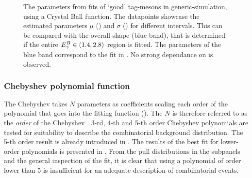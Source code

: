 \begin{figure}[htbp!]
    \caption{\label{fig:crystal_ball_par_test}The parameters from \Mbc fits of `good' tag-\B mesons in generic-\BB simulation, using a Crystal Ball function.
    The datapoints showcase the estimated parameters $\mu$ () and $\sigma$ () for different
    \EB intervals.
    This can be compared with the overall shape (blue band), that is determined if the entire ${E^B_{\gamma}}\in(1.4,2.8)$ region is fitted.
    The parameters of the blue band correspond to the fit in .
    No strong dependance on \EB is observed.
    }
\end{figure}

\subsubsection{Chebyshev polynomial function}\label{sec:chebyshev_prefit}

The Chebyshev \PDF takes $N$ parameters as coefficients scaling each order of the polynomial that goes into the fitting function ().
The $N$ is therefore referred to as the \textit{order} of the Chebyshev \PDF.
3-rd, 4-th and 5-th order Chebyshev polynomials are tested for suitability to describe the combinatorial \BB background distribution.
The 5-th order result is already introduced in .
The results of the best fit for lower-order polynomials is presented in .
From the pull distributions in the subpanels and the general inspection of the fit, it is clear that using a polynomial of order lower than 5 is insufficient for an adequate description of combinatorial \BB events.

